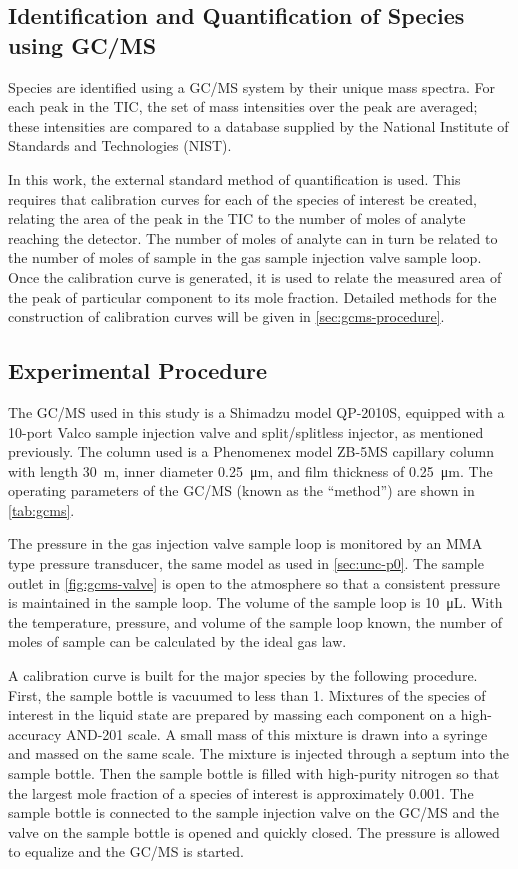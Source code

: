 \documentclass[../main.tex]{subfiles}
\begin{document}
\subsection{Identification and Quantification of Species using GC/MS}

Species are identified using a GC/MS system by their unique mass spectra.
For each peak in the TIC, the set of mass intensities over the peak are
averaged; these intensities are compared to a database supplied by the
National Institute of Standards and Technologies (NIST).

In this work, the external standard method of quantification is used.
This requires that calibration curves for each of the species of
interest be created, relating the area of the peak in the TIC to
the number of moles of analyte reaching the detector. The number of
moles of analyte can in turn be related to the number of moles of
sample in the gas sample injection valve sample loop. Once the
calibration curve is generated, it is used to relate the measured
area of the peak of particular component to its mole fraction. Detailed
methods for the construction of calibration curves will be given in
\autoref{sec:gcms-procedure}.

\subsection{Experimental Procedure}
\label{sec:gcms-procedure}

The GC/MS used in this study is a
Shimadzu model QP-2010S, equipped with a 10-port Valco sample injection
valve and split/splitless injector, as mentioned previously. The column
used is a Phenomenex model ZB-5MS capillary column
with length \SI{30}{\meter}, inner diameter \SI{0.25}{\micro\meter}, and film
thickness of \SI{0.25}{\micro\meter}. The operating parameters of the GC/MS
(known as the ``method'') are shown in \autoref{tab:gcms}.

The pressure in the gas injection valve sample loop is monitored by an
MMA type pressure transducer, the same model as used in \autoref{sec:unc-p0}. The
sample outlet in \autoref{fig:gcms-valve} is open to the atmosphere
so that a consistent pressure is maintained in the sample loop.
The volume of the sample loop is \SI{10}{\micro\liter}. With
the temperature, pressure, and volume of the sample loop known,
the number of moles of sample can be calculated by the ideal
gas law.

A calibration curve is built for the major species by the
following procedure. First, the sample bottle is vacuumed
to less than \SI{1}{\torr}. Mixtures of the species of
interest in the liquid state are prepared by massing each
component on a high-accuracy AND-201 scale. A small mass
of this mixture is drawn into a syringe and massed on the
same scale. The mixture is injected through a septum into
the sample bottle. Then the sample bottle is filled with
high-purity nitrogen so that the largest mole fraction of
a species of interest is approximately 0.001. The sample
bottle is connected to the sample injection valve on the
GC/MS and the valve on the sample bottle is opened and
quickly closed. The pressure is allowed to equalize and
the GC/MS is started.
\end{document}
